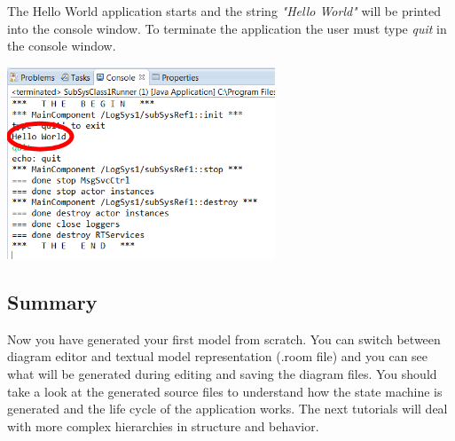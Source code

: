 The Hello World application starts and the string \emph{"Hello World"} will be printed into the console window. To terminate the application the user must type \emph{quit} in the console window.

\includegraphics[width=0.6\textwidth]{images/015-HelloWorld08.png}



\subsection{Summary}

Now you have generated your first \eTrice{} model from scratch. You can switch between diagram editor and 
textual model representation (.room file) and you can see what will be generated during editing and saving the diagram files. 
You should take a look at the generated source files to understand how the state machine is generated and 
the life cycle of the application works. The next tutorials will deal with more complex hierarchies in structure and behavior.
